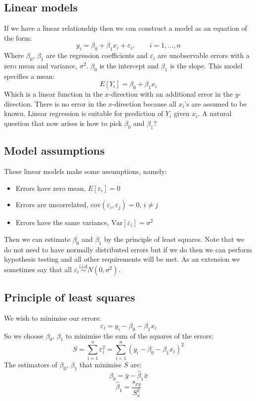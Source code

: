 \documentclass[12pt]{article}
\newcommand{\Var}[1]{\text{Var}[#1]}
\begin{document}
\subsection*{Linear models}
If we have a linear relationship then we can construct a model as an equation of the form:
\[y_i=\beta_0+\beta_1x_i+\varepsilon_i,\qquad i=1,\dots,n\]
Where \(\beta_0,\,\beta_1\) are the regression coefficients and \(\varepsilon_i\) are unobservable errors with a zero mean and variance, \(\sigma^2\). \(\beta_0\) is the intercept and \(\beta_1\) is the slope. This model specifies a mean:
\[E[Y_i]=\beta_0+\beta_1x_i\]
Which is a linear function in the \(x\)-direction with an additional error in the \(y\)-direction. There is no error in the \(x\)-direction because all \(x_i\)'s are assumed to be known. Linear regression is suitable for prediction of \(Y_i\) given \(x_i\). A natural question that now arises is how to pick \(\beta_0\) and \(\beta_1\)?
\subsection*{Model assumptions}
These linear models make some assumptions, namely:
\begin{itemize}
    \item Errors have zero mean, \(E[\varepsilon_i]=0\)
    \item Errors are uncorrelated, \(\text{cov}(\varepsilon_i,\varepsilon_j)=0,\,i\ne j\)
    \item Errors have the same variance, \(\Var{\varepsilon_i}=\sigma^2\)
\end{itemize}
Then we can estimate \(\beta_0\) and \(\beta_1\) by the principle of least squares. Note that we do not need to have normally distributed errors but if we do then we can perform hypothesis testing and all other requirements will be met. As an extension we sometimes say that all \(\varepsilon_i\overset{\text{i.i.d}}{\sim}N(0,\sigma^2)\).
\subsection*{Principle of least squares}
We wish to minimise our errors:
\[\varepsilon_i=y_i-\beta_0-\beta_1x_i\]
So we choose \(\beta_0,\,\beta_1\) to minimise the sum of the squares of the errors:
\[S=\sum^n_{i=1}\varepsilon_i^2=\sum^n_{i=1}(y_i-\beta_0-\beta_1x_i)^2\]
The estimators of \(\beta_0,\,\beta_1\) that minimise \(S\) are:
\[\hat{\beta}_0=\bar{y}-\hat{\beta}_1\bar{x}\]
\[\hat{\beta}_1=\frac{s_{xy}}{S_x^2}\]
\end{document}
